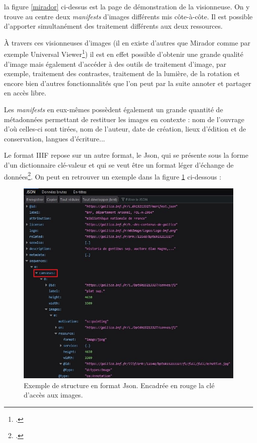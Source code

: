 \documentclass[a4paper,12pt,twoside]{book}
\begin{document}
la figure \ref{mirador} ci-dessus est la page de démonstration de la visionneuse. On y trouve au centre deux \textit{manifests} d'images différents mis côte-à-côte. Il est possible d'apporter simultanément des traitement différents aux deux ressources.


À travers ces visionneuses d'images (il en existe d'autres que Mirador comme par exemple Universal Viewer\footcite{universal}) il est en effet possible d'obtenir une grande qualité d'image mais également d'accéder à des outils de traitement d'image, par exemple, traitement des contrastes, traitement de la lumière, de la rotation et encore bien d'autres fonctionnalités que l'on peut par la suite annoter et partager en accès libre.

Les \textit{manifests} en eux-mêmes possèdent également un grande quantité de métadonnées permettant de restituer les images en contexte : nom de l'ouvrage d'où celles-ci sont tirées, nom de l'auteur, date de création, lieux d'édition et de conservation, langues d'écriture...


Le format \acrshort{IIIF} repose sur un autre format, le Json, qui se présente sous la forme d'un \og dictionnaire clé-valeur\fg{} et qui se veut être un format léger d'échange de données\footcite{json}. On peut en retrouver un exemple dans la figure \ref{json} ci-dessous :

\begin{figure}[H]
    \centering
    \includegraphics[width=12cm]{img/partie_3/json.JPG}
    \caption{Exemple de structure en format Json. Encadrée en rouge la clé d'accès aux images.}
    \label{json}
\end{figure}
\end{document}
